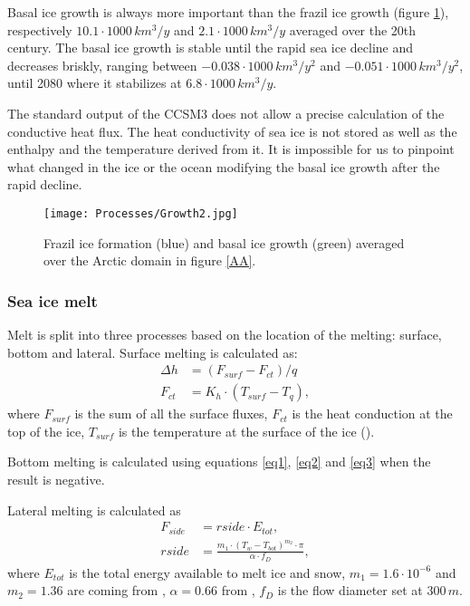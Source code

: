 Basal ice growth is always more important than the frazil ice growth (figure \ref{growth}), respectively $10.1 \cdot 1000 \, km^3/y$ and $2.1 \cdot 1000 \, km^3/y$ averaged over the 20th century. The basal ice growth is stable until the rapid sea ice decline and decreases briskly, ranging between $-0.038 \cdot 1000 \, km^3/y^2$ and $-0.051 \cdot 1000 \, km^3/y^2$, until 2080 where it stabilizes at $6.8 \cdot 1000 \, km^3/y$. 

The standard output of the CCSM3 does not allow a precise calculation of the conductive heat flux. The heat conductivity of sea ice is not stored as well as the enthalpy and the temperature derived from it. It is impossible for us to pinpoint what changed in the ice or the ocean modifying the basal ice growth after the rapid decline. 

\begin{figure}
\center
\noindent\texttt{[image: Processes/Growth2.jpg]}
\caption{Frazil ice formation (blue) and basal ice growth (green) averaged over the Arctic domain in figure \ref{AA}.}
\label{growth}
\end{figure}

\subsubsection{Sea ice melt}\label{melta}

Melt is split into three processes based on the location of the melting: surface, bottom and lateral. Surface melting is calculated as:
\begin{align}
\Delta h &= (F_{surf} - F_{ct})/q \label{eqm1}\\
F_{ct} &= K_h \cdot (T_{surf} - T_q), \label{eqm2}
\end{align}
where $F_{surf}$ is the sum of all the surface fluxes, $F_{ct}$ is the heat conduction at the top of the ice, $T_{surf}$ is the temperature at the surface of the ice (\cite{Hunke:2008ly}).

Bottom melting is calculated using equations \ref{eq1}, \ref{eq2} and \ref{eq3} when the result is negative. 

Lateral melting is calculated as 
\begin{align}
F_{side} &= rside \cdot E_{tot}, \label{eqml1}\\
rside &= \frac{m_1 \cdot (T_w - T_{bot})^{m_2} \cdot \pi}{\alpha \cdot f_D},\label{eqml2}
\end{align}
where $E_{tot}$ is the total energy available to melt ice and snow, $m_1 = 1.6\cdot 10^{-6}$ and $m_2 = 1.36$ are coming from \cite{MaykutPero1987}, $\alpha = 0.66$ from \cite{Steele1992}, $f_D$ is the flow diameter set at $300 \, m$. 

